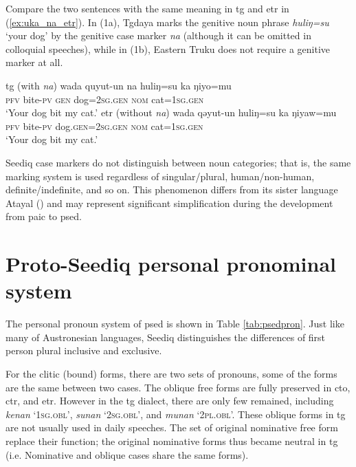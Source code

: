 Compare the two sentences with the same meaning in \acl{tg} and \acl{etr} in (\ref{ex:uka_na_etr}). In (1a), Tgdaya marks the genitive noun phrase \textit{huliŋ=su} `your dog' by the genitive case marker \textit{na} (although it can be omitted in colloquial speeches), while in (1b), Eastern Truku does not require a genitive marker at all. 

\begin{exe}
\ex \label{ex:uka_na_etr} \textcite[69]{Lee2018Trugrammar}
    \begin{xlist}
    \ex \acl{tg} (with \textit{na})
    \gll wada quyut-un na huliŋ=su ka ŋiyo=mu \\
    \textsc{pfv} bite-\textsc{pv} \textsc{gen} dog=\textsc{2sg.gen} \textsc{nom} cat=\textsc{1sg.gen}\\
    \glt `Your dog bit my cat.'
    \ex \acl{etr} (without \textit{na})
    \gll wada qəyut-un huliŋ=su ka ŋiyaw=mu \\
    \textsc{pfv} bite-\textsc{pv} dog.\textsc{gen}=\textsc{2sg.gen} \textsc{nom} cat=\textsc{1sg.gen}\\
    \glt `Your dog bit my cat.'
    \end{xlist}
\end{exe}

Seediq case markers do not distinguish between noun categories; that is, the same marking system is used regardless of singular/plural, human/non-human, definite/indefinite, and so on. This phenomenon differs from its sister language Atayal (\cite{huang1995}) and may represent significant simplification during the development from \acl{paic} to \acl{psed}.

\section{Proto-Seediq personal pronominal system} \label{sec:psed_pron}

The personal pronoun system of \acl{psed} is shown in Table \ref{tab:psedpron}. Just like many of Austronesian languages, Seediq distinguishes the differences of first person plural inclusive and exclusive. 

For the clitic (bound) forms, there are two sets of pronouns, some of the forms are the same between two cases. The oblique free forms are fully preserved in \acl{cto}, \acl{ctr}, and \acl{etr}. However in the \acl{tg} dialect, there are only few remained, including \textit{kenan} `\textsc{1sg.obl}', \textit{sunan} `\textsc{2sg.obl}', and \textit{munan} `\textsc{2pl.obl}'. These oblique forms in \acl{tg} are not usually used in daily speeches. The set of original nominative free form replace their function; the original nominative forms thus became neutral in \acl{tg} (i.e. Nominative and oblique cases share the same forms).

